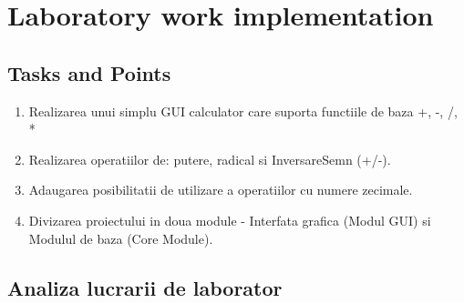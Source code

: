 \section{Laboratory work implementation}

\subsection{Tasks and Points}
\begin{enumerate}
	\item  Realizarea unui simplu GUI calculator care suporta functiile de baza +, -, /, *
	\item  Realizarea operatiilor de: putere, radical si InversareSemn (+/-).
	\item  Adaugarea posibilitatii de utilizare a operatiilor cu numere zecimale.
	\item  Divizarea proiectului in doua module - Interfata grafica (Modul GUI) si Modulul de baza (Core Module).
	
\end{enumerate}

\subsection{Analiza lucrarii de laborator}

